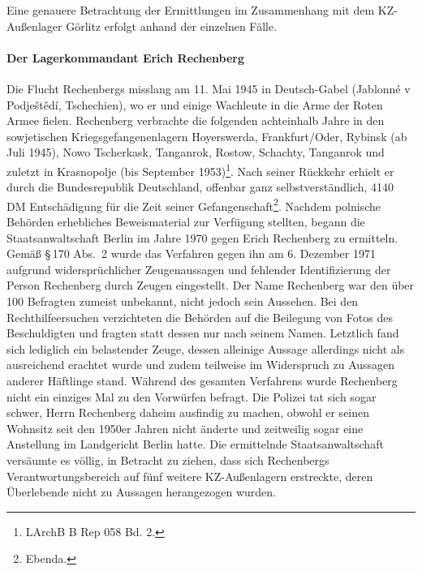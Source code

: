 \documentclass[a4paper,12pt,ngerman,
]{nisebook}
\begin{document}
Eine genauere Betrachtung der Ermittlungen im Zusammenhang mit dem KZ-Außenlager Görlitz erfolgt anhand der einzelnen Fälle. 

\newpage
\paragraph{Der Lagerkommandant Erich Rechenberg\label{rechenberg_ahndung}}
Die Flucht Rechenbergs misslang am 11. Mai 1945 in Deutsch-Gabel (Jablonné v Podještědí, Tschechien), wo er und einige Wachleute in die Arme der Roten Armee fielen. Rechenberg
verbrachte die folgenden achteinhalb Jahre in den sowjetischen Kriegsgefangenenlagern
Hoyerswerda, Frankfurt/Oder, Rybinsk (ab Juli 1945), Nowo Tscherkask, Tanganrok, Rostow, Schachty, Tanganrok und zuletzt in Krasnopolje (bis September 1953)\footnote{LArchB B Rep 058 Bd. 2.}. Nach
seiner Rückkehr erhielt er durch die Bundesrepublik Deutschland, offenbar ganz selbstverständlich, 4140 DM Entschädigung für die Zeit seiner Gefangenschaft\footnote{Ebenda.}.
\newline
Nachdem polnische Behörden erhebliches Beweismaterial zur Verfügung stellten, begann die Staatsanwaltschaft Berlin im Jahre 1970 gegen Erich Rechenberg zu ermitteln.
Gemäß \S\,170 Abs.~2 wurde das Verfahren gegen ihn am 6. Dezember 1971 aufgrund widersprüchlicher Zeugenaussagen und fehlender Identifizierung der Person Rechenberg durch Zeugen eingestellt. Der Name Rechenberg war den über 100 Befragten zumeist unbekannt, nicht jedoch sein Aussehen. Bei den Rechthilfeersuchen verzichteten die Behörden auf die Beilegung von Fotos des Beschuldigten und fragten statt dessen nur nach seinem Namen. Letztlich fand sich lediglich ein belastender Zeuge, dessen alleinige Aussage allerdings nicht als ausreichend erachtet wurde und zudem teilweise im Widerspruch zu Aussagen anderer Häftlinge stand. Während des gesamten Verfahrens wurde Rechenberg nicht ein einziges Mal zu den Vorwürfen befragt. Die Polizei tat sich sogar schwer, Herrn Rechenberg daheim ausfindig zu machen, obwohl er seinen Wohnsitz seit den 1950er Jahren nicht änderte und zeitweilig sogar eine Anstellung im Landgericht Berlin hatte. Die ermittelnde Staatsanwaltschaft versäumte es völlig, in Betracht zu ziehen, dass sich Rechenbergs Verantwortungsbereich auf fünf weitere KZ-Außenlagern erstreckte, deren Überlebende nicht zu Aussagen herangezogen wurden.
\end{document}
